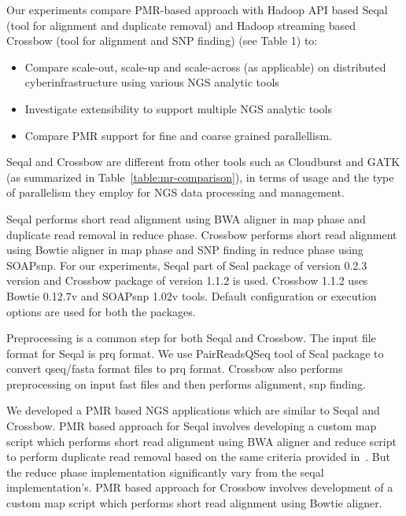 \documentclass{acm_proc_article-sp}
\begin{document}
Our experiments compare PMR-based approach with Hadoop API based Seqal
(tool for alignment and duplicate removal) and Hadoop streaming based
Crossbow (tool for alignment and SNP finding) (see Table 1) to:

\begin{itemize}

\item{Compare scale-out, scale-up and scale-across (as applicable) on
    distributed cyberinfrastructure using various NGS analytic tools}


\item{Investigate extensibility to support multiple NGS analytic
    tools}
\item{Compare PMR support for fine and coarse grained parallellism}.
\end{itemize}

Seqal and Crossbow are different from other tools such as Cloudburst
and GATK (as summarized in Table~\ref{table:mr-comparison}), in terms
of usage and the type of parallelism they employ for NGS data
processing and management.

Seqal performs short read alignment using BWA aligner in map phase and
duplicate read removal in reduce phase.  Crossbow performs short read
alignment using Bowtie aligner in map phase and SNP finding in reduce
phase using SOAPsnp. For our experiments, Seqal part of Seal package
of version 0.2.3 version and Crossbow package of version 1.1.2 is
used. Crossbow 1.1.2 uses Bowtie 0.12.7v and SOAPsnp 1.02v
tools. Default configuration or execution options are used for both
the packages.

Preprocessing is a common step for both Seqal and Crossbow. The input
file format for Seqal is prq format.  We use PairReadsQSeq tool of
Seal package to convert qseq/fasta format files to prq
format. Crossbow also performs preprocessing on input fast files and
then performs alignment, snp finding. 

We developed a PMR based NGS applications which are similar to Seqal
and Crossbow. PMR based approach for Seqal involves developing a
custom map script which performs short read alignment using BWA
aligner and reduce script to perform duplicate read removal based on
the same criteria provided in~\cite{seal_2011_mapred}. But the reduce
phase implementation significantly vary from the seqal
implementation's. PMR based approach for Crossbow involves development
of a custom map script which performs short read alignment using
Bowtie aligner.
\end{document}
